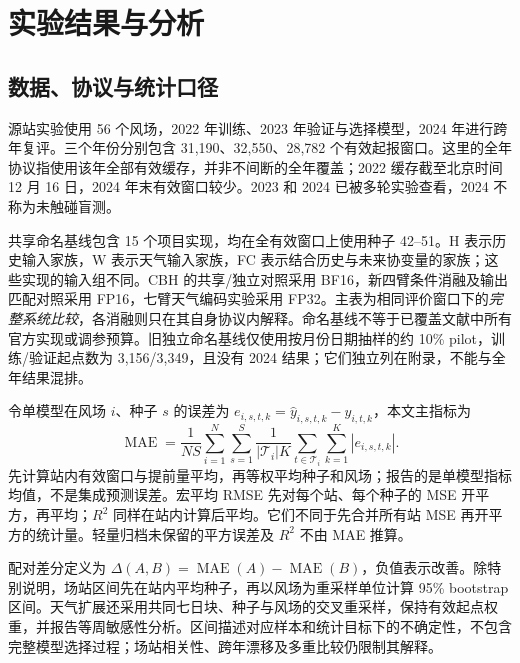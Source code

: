 \section{实验结果与分析}
\label{sec:results}
\subsection{数据、协议与统计口径}
源站实验使用 56 个风场，2022 年训练、2023 年验证与选择模型，2024 年进行跨年复评。三个年份分别包含 31,190、32,550、28,782 个有效起报窗口。这里的全年协议指使用该年全部有效缓存，并非不间断的全年覆盖；2022 缓存截至北京时间 12 月 16 日，2024 年末有效窗口较少。2023 和 2024 已被多轮实验查看，2024 不称为未触碰盲测。

共享命名基线包含 15 个项目实现，均在全有效窗口上使用种子 42--51。H 表示历史输入家族，W 表示天气输入家族，FC 表示结合历史与未来协变量的家族；这些实现的输入组不同。CBH 的共享/独立对照采用 BF16，新四臂条件消融及输出匹配对照采用 FP16，七臂天气编码实验采用 FP32。主表为相同评价窗口下的\emph{完整系统比较}，各消融则只在其自身协议内解释。命名基线不等于已覆盖文献中所有官方实现或调参预算。旧独立命名基线仅使用按月份日期抽样的约 10\% pilot，训练/验证起点数为 3,156/3,349，且没有 2024 结果；它们独立列在附录，不能与全年结果混排。

令单模型在风场 $i$、种子 $s$ 的误差为 $e_{i,s,t,k}=\hat y_{i,s,t,k}-y_{i,t,k}$，本文主指标为
\begin{equation}
 \operatorname{MAE}=\frac1{NS}\sum_{i=1}^{N}\sum_{s=1}^{S}
 \frac1{|\mathcal T_i|K}\sum_{t\in\mathcal T_i}\sum_{k=1}^{K}|e_{i,s,t,k}|.
\end{equation}
先计算站内有效窗口与提前量平均，再等权平均种子和风场；报告的是单模型指标均值，不是集成预测误差。宏平均 RMSE 先对每个站、每个种子的 MSE 开平方，再平均；$R^2$ 同样在站内计算后平均。它们不同于先合并所有站 MSE 再开平方的统计量。轻量归档未保留的平方误差及 $R^2$ 不由 MAE 推算。

配对差分定义为 $\Delta(A,B)=\operatorname{MAE}(A)-\operatorname{MAE}(B)$，负值表示改善。除特别说明，场站区间先在站内平均种子，再以风场为重采样单位计算 95\% bootstrap 区间。天气扩展还采用共同七日块、种子与风场的交叉重采样，保持有效起点权重，并报告等周敏感性分析。区间描述对应样本和统计目标下的不确定性，不包含完整模型选择过程；场站相关性、跨年漂移及多重比较仍限制其解释。

